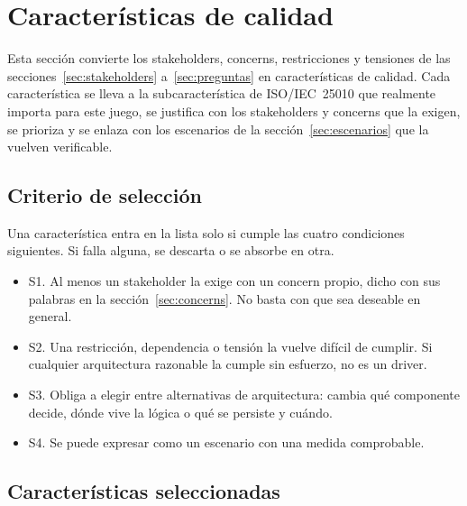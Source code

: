 \section{Características de calidad}\label{sec:calidad}

Esta sección convierte los stakeholders, concerns, restricciones y tensiones de las secciones~\ref{sec:stakeholders} a~\ref{sec:preguntas} en características de calidad. Cada característica se lleva a la subcaracterística de ISO/IEC~25010 que realmente importa para este juego, se justifica con los stakeholders y concerns que la exigen, se prioriza y se enlaza con los escenarios de la sección~\ref{sec:escenarios} que la vuelven verificable.

\subsection{Criterio de selección}

Una característica entra en la lista solo si cumple las cuatro condiciones siguientes. Si falla alguna, se descarta o se absorbe en otra.

\begin{itemize}
  \item S1. Al menos un stakeholder la exige con un concern propio, dicho con sus palabras en la sección~\ref{sec:concerns}. No basta con que sea deseable en general.
  \item S2. Una restricción, dependencia o tensión la vuelve difícil de cumplir. Si cualquier arquitectura razonable la cumple sin esfuerzo, no es un driver.
  \item S3. Obliga a elegir entre alternativas de arquitectura: cambia qué componente decide, dónde vive la lógica o qué se persiste y cuándo.
  \item S4. Se puede expresar como un escenario con una medida comprobable.
\end{itemize}

\subsection{Características seleccionadas}

